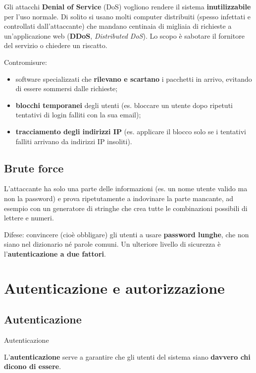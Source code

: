 Gli attacchi \textbf{Denial of Service} (DoS) vogliono rendere il
sistema \textbf{inutilizzabile} per l'uso normale. Di solito si usano
molti computer distribuiti (spesso infettati e controllati
dall'attaccante) che mandano centinaia di migliaia di richieste a
un'applicazione web (\textbf{DDoS}, \emph{Distributed DoS}). Lo scopo è
sabotare il fornitore del servizio o chiedere un riscatto.

Contromisure:

\begin{itemize}
\tightlist
\item
  software specializzati che \textbf{rilevano e scartano} i pacchetti in
  arrivo, evitando di essere sommersi dalle richieste;
\item
  \textbf{blocchi temporanei} degli utenti (es. bloccare un utente dopo
  ripetuti tentativi di login falliti con la sua email);
\item
  \textbf{tracciamento degli indirizzi IP} (es. applicare il blocco solo
  se i tentativi falliti arrivano da indirizzi IP insoliti).
\end{itemize}

\subsection{Brute force}\label{brute-force}

L'attaccante ha solo una parte delle informazioni (es. un nome utente
valido ma non la password) e prova ripetutamente a indovinare la parte
mancante, ad esempio con un generatore di stringhe che crea tutte le
combinazioni possibili di lettere e numeri.

Difese: convincere (cioè obbligare) gli utenti a usare \textbf{password
lunghe}, che non siano nel dizionario né parole comuni. Un ulteriore
livello di sicurezza è l'\textbf{autenticazione a due fattori}.

\section{Autenticazione e
autorizzazione}\label{autenticazione-e-autorizzazione}

\subsection{Autenticazione}\label{autenticazione}

\begin{boxdefinition}{Autenticazione}

L'\textbf{autenticazione} serve a garantire che gli utenti del sistema
siano \textbf{davvero chi dicono di essere}.

\end{boxdefinition}

